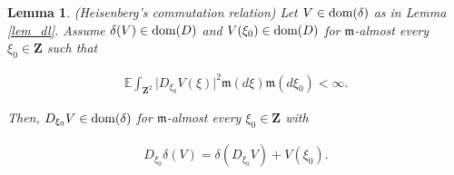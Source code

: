 \documentclass[letterpaper, 11pt,  reqno]{amsart}
\newtheorem{lemma}[theorem]{Lemma}
\newcommand{\noi}{\noindent}
\newcommand{\E}{\mathbb{E}}
\newcommand{\dl}{\delta}
\newcommand{\fm}{\mathfrak{m}}
\newcommand{\dom}{\textup{dom}}
\numberwithin{equation}{section}
\numberwithin{theorem}{section}
\begin{document}
\begin{lemma}\label{lem_Heis}\textup{(Heisenberg's commutation relation)} 
%
%
%
Let $V\in\dom(\dl)$ as in Lemma \ref{lem_dl}.
Assume $\dl(V)\in\dom(D)$ and $V(\xi_0)\in\dom(D)$
for $\fm$-almost every $\xi_0\in\mathbf{Z}$ such that 

\noi
\begin{align}\label{cond_H1}
\E\int_{\mathbf{Z}^2} \big| D_{\xi_0} V(\xi) \big|^2 \fm(d\xi) \fm(d\xi_0) <\infty.
\end{align}

\noi
 Then,     $D_{\xi_0}V  \in \dom(\dl)$ for $\fm$-almost 
every $\xi_0\in\mathbf{Z}$ with



 

\noi
\begin{align}\label{com_rel}
D_{\xi_0}  \dl(V)=  \dl(  D_{\xi_0} V) + V(\xi_0) .
\end{align}

\end{lemma}
\end{document}
